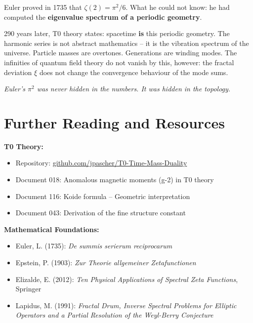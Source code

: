 	Euler proved in 1735 that $\zeta(2) = \pi^2/6$. What he could not know: he had computed the \textbf{eigenvalue spectrum of a periodic geometry}.
	
	290 years later, T0 theory states: spacetime \textbf{is} this periodic geometry. The harmonic series is not abstract mathematics -- it is the vibration spectrum of the universe. Particle masses are overtones. Generations are winding modes. The infinities of quantum field theory do not vanish by this, however: the fractal deviation $\xi$ does not change the convergence behaviour of the mode sums.
	
	\begin{center}
		\large\textit{Euler's $\pi^2$ was never hidden in the numbers. It was hidden in the topology.}
	\end{center}


	\section*{Further Reading and Resources}
	
	\textbf{T0 Theory:}
	\begin{itemize}
		\item Repository: \href{https://github.com/jpascher/T0-Time-Mass-Duality}{github.com/jpascher/T0-Time-Mass-Duality}
		\item Document 018: Anomalous magnetic moments (g-2) in T0 theory
		\item Document 116: Koide formula -- Geometric interpretation
		\item Document 043: Derivation of the fine structure constant
	\end{itemize}
	
	\textbf{Mathematical Foundations:}
	\begin{itemize}
		\item Euler, L. (1735): \textit{De summis serierum reciprocarum}
		\item Epstein, P. (1903): \textit{Zur Theorie allgemeiner Zetafunctionen}
		\item Elizalde, E. (2012): \textit{Ten Physical Applications of Spectral Zeta Functions}, Springer
		\item Lapidus, M. (1991): \textit{Fractal Drum, Inverse Spectral Problems for Elliptic Operators and a Partial Resolution of the Weyl-Berry Conjecture}
	\end{itemize}
